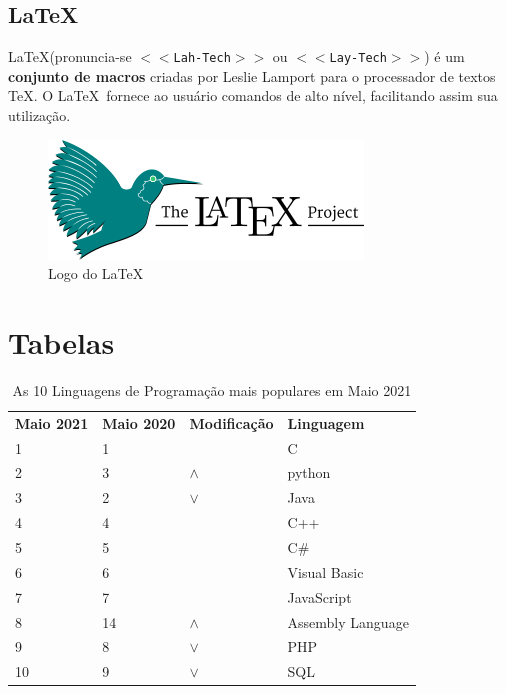\documentclass[
	12pt,    %
	oneside, %
	a4paper, %
	chapter=TITLE, %
	section=TITLE, %
	sumario=tradicional, %
	english, %
	brazil   %
] {abntex2}
\begin{document}
	\section{LaTeX}
	
	La\TeX(pronuncia-se \texttt{$<<$Lah-Tech$>>$} ou \texttt{$<<$Lay-Tech$>>$}) é um \textbf{conjunto de macros} criadas por Leslie Lamport para o processador de textos \TeX. O La\TeX \ fornece ao usuário comandos de alto nível, facilitando assim sua utilização.
	
	\begin{figure}[htb]		
		\caption{Logo do La\TeX}
		\label{latex-logo}
		\centering
		\includegraphics[scale=.5]{./figuras/latex-project-logo.png}
	\end{figure}	

	\chapter{Tabelas}\label{sec:tabelas}
	
	\begin{table}[!htb]
		\centering
		\caption{As 10 Linguagens de Programação mais populares em Maio 2021}
		\label{tab:proglangs-v1}
		\vspace{3mm}
		\begin{tabular}{@{}llll@{}}
			\toprule[.1em]
			\textbf{Maio 2021}	& \textbf{Maio 2020}	& \textbf{Modificação}	& \textbf{Linguagem}\\
			\cmidrule{1-4}
					1			& 1     				&        					& C \\
					2			& 3     				& {\color{green}$\wedge$}	& python \\
					3			& 2     				& {\color{red}$\vee$}		& Java \\
					4			& 4     				& 							& C++ \\
					5			& 5     				& 							& C\# \\
					6			& 6     				& 							& Visual Basic \\
					7			& 7     				& 							& JavaScript \\
					8			& 14     				& {\color{green}$\wedge$}	& Assembly Language \\
					9			& 8     				& {\color{red}$\vee$}		& PHP \\				
					10			& 9     				& {\color{red}$\vee$}		& SQL \\				
			\bottomrule[.08em]
		\end{tabular}
	\end{table}
	
\end{document}
